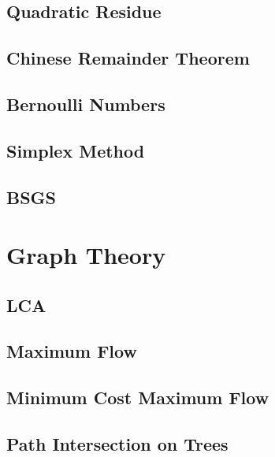 \subsection{Quadratic Residue}
\raggedbottom
\hrulefill
\subsection{Chinese Remainder Theorem}
\raggedbottom
\hrulefill
\subsection{Bernoulli Numbers}
\raggedbottom
\hrulefill
\subsection{Simplex Method}
\raggedbottom
\hrulefill
\subsection{BSGS}
\raggedbottom
\hrulefill

\section{Graph Theory}
\subsection{LCA}
\raggedbottom
\hrulefill
\subsection{Maximum Flow}
\raggedbottom
\hrulefill
\subsection{Minimum Cost Maximum Flow}
\raggedbottom
\hrulefill
\subsection{Path Intersection on Trees}
\raggedbottom
\hrulefill

